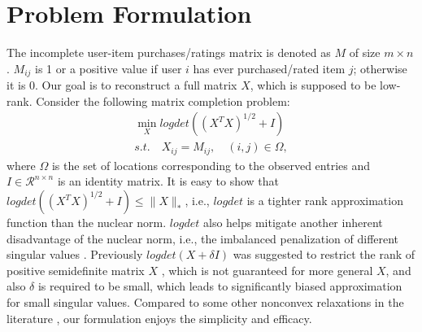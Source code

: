 \documentclass[letterpaper]{article}
\begin{document}
\section{Problem Formulation}
The incomplete user-item purchases/ratings matrix is denoted as $M$ of size $m \times n$. $M_{ij}$ is 1 or a positive value if user $i$ has ever purchased/rated item $j$; otherwise it is 0. Our goal is to reconstruct a full matrix $X$, which is supposed to be low-rank.  
Consider the following matrix completion problem:
\begin{equation}
\begin{split}
\min_X logdet ((X^TX)^{1/2}+I)   \\
s.t.\quad X_{ij}=M_{ij},\quad (i,j)\in \Omega,  
\end{split}
\label{originalprob}
\end{equation}
where $\Omega$ is the set of locations corresponding to the observed entries and $I\in \mathcal{R}^{n\times n}$ is an identity matrix. It is easy to show that $logdet((X^TX)^{1/2}+I)\leq\|X\|_*$, i.e., $logdet$ is a tighter rank approximation function than the nuclear norm. $logdet$ also helps mitigate another inherent disadvantage of the nuclear norm, i.e., the imbalanced penalization of different singular values \cite{kang2015robust}. Previously $logdet(X+\delta I)$ was suggested to restrict the rank of positive semidefinite matrix $X$ \cite{fazel2003log}, which is not guaranteed for more general $X$, and also $\delta$ is required to be small, which leads to significantly biased approximation for small singular values. Compared to some other nonconvex relaxations in the literature \cite{lu2014generalized}, our formulation enjoys the simplicity and efficacy. 
\end{document}
